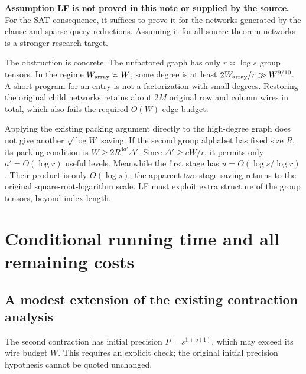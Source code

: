 \documentclass[11pt]{article}
\theoremstyle{definition}
\theoremstyle{remark}
\begin{document}
\textbf{Assumption LF is not proved in this note or supplied by the source.}
For the SAT consequence, it suffices to prove it for the networks generated
by the clause and sparse-query reductions. Assuming it for all source-theorem
networks is a stronger research target.

The obstruction is concrete. The unfactored graph has only $r\asymp\log s$
group tensors. In the regime $W_{\rm array}\asymp W$, some degree is at
least $2W_{\rm array}/r\gg W^{9/10}$. A short program for an entry is not
a factorization with small degrees. Restoring the original child networks
retains about $2M$ original row and column wires in total, which also fails
the required $O(W)$ edge budget.

Applying the existing packing argument directly to the high-degree graph
does not give another $\sqrt{\log W}$ saving. If the second group alphabet
has fixed size $R$, its packing condition is
$W\ge2R^{4a'}\Delta'$. Since $\Delta'\ge cW/r$, it permits only
$a'=O(\log r)$ useful levels. Meanwhile the first stage has
$u=O(\log s/\log r)$. Their product is only $O(\log s)$; the apparent
two-stage saving returns to the original square-root-logarithm scale.
LF must exploit extra structure of the group tensors, beyond index length.

\section{Conditional running time and all remaining costs}\label{sec:bound}

\subsection{A modest extension of the existing contraction analysis}
The second contraction has initial precision $P=s^{1+o(1)}$, which may exceed
its wire budget $W$. This requires an explicit check; the original initial
precision hypothesis cannot be quoted unchanged.
\end{document}
